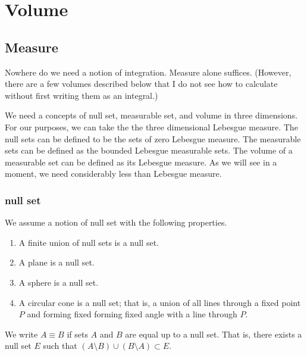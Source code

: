 
\chapter{Volume}

\section{Measure}

Nowhere do we need a notion
of integration.  Measure alone suffices.  (However, there are a few
volumes described below that I do not see how to calculate without
first writing them as an integral.)

We need a concepts of null set, measurable set, and volume in
three dimensions.  For our purposes, we can take the
the three dimensional Lebesgue measure.   
The null sets can be defined
to be the sets of zero Lebesgue measure. The measurable sets can
be defined as the bounded Lebesgue measurable sets.  The volume of
a measurable set can be defined as its Lebesgue measure.
As we will see in a moment, we need considerably less than Lebesgue measure.


\subsection{null set}\label{sec:null}

We assume a notion of null set with the following
properties.

\begin{enumerate}%
\item A finite union of null sets is a null set.\\
 \item A plane is a null set.\\
 \item A sphere is a null set.\\
 \item A circular cone is a null set; that is, a union of all
  lines through a fixed point $P$ and forming fixed
 forming fixed angle with a line through $P$.
\end{enumerate}

We write $A\equiv B$ if sets $A$ and $B$ are equal up to a null set.
That is, there exists a null set $E$ such that
   $(A\setminus B) \cup (B\setminus A) \subset E$.

